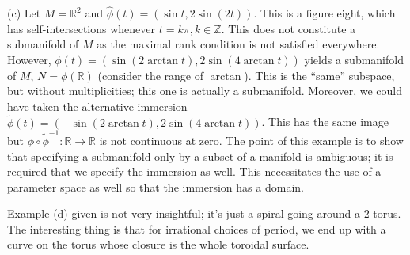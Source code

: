 \documentclass[a4paper]{article}
\newcommand{\R}{\mathbb{R}}
\newcommand{\Z}{\mathbb{Z}}
\begin{document}
(c) Let $M = \R^2$ and $\hat\phi(t) = (\sin t, 2\sin(2t))$. This is a figure eight, which has self-intersections whenever $t = k\pi, k \in \Z$. This does not constitute a submanifold of $M$ as the maximal rank condition is not satisfied everywhere. However, $\phi(t) = (\sin(2\arctan t), 2\sin(4\arctan t))$ yields a submanifold of $M$, $N = \phi(\R)$ (consider the range of $\arctan$). This is the ``same'' subspace, but without multiplicities; this one is actually a submanifold. Moreover, we could have taken the alternative immersion $\tilde\phi(t) = (-\sin(2\arctan t), 2\sin(4\arctan t))$. This has the same image but $\phi \circ \tilde\phi^{-1} : \R \to \R$ is not continuous at zero. The point of this example is to show that specifying a submanifold only by a subset of a manifold is ambiguous; it is required that we specify the immersion as well. This necessitates the use of a parameter space as well so that the immersion has a domain.

Example (d) given is not very insightful; it's just a spiral going around a 2-torus. The interesting thing is that for irrational choices of period, we end up with a curve on the torus whose closure is the whole toroidal surface.
\end{document}
